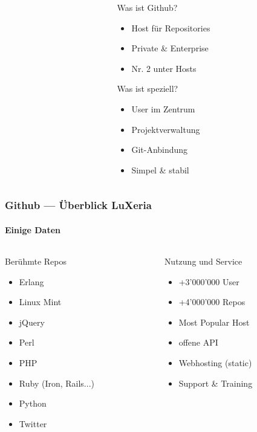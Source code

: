 \begin{frame}
\begin{columns}
\begin{column}{5cm}
		\end{column}
		\begin{column}{5cm}
			\begin{block}{Was ist Github?}
				\begin{itemize}
					\item Host für Repositories
					\item Private \& Enterprise
					\item Nr. 2 unter Hosts
				\end{itemize}
			\end{block}
			\begin{block}{Was ist speziell?}
				\begin{itemize}
					\item User im Zentrum
					\item Projektverwaltung
					\item Git-Anbindung
					\item Simpel \& stabil
				\end{itemize}
			\end{block}
		\end{column}
	\end{columns}
\end{frame}

\begin{frame}
	\frametitle{Github --- Überblick \hfill{} LuXeria}
	\framesubtitle{Einige Daten}
	\begin{columns}
		\begin{column}{5cm}
			\begin{block}{Berühmte Repos}
				\begin{itemize}
					\item Erlang
					\item Linux Mint
					\item jQuery
					\item Perl
					\item PHP
					\item Ruby (Iron, Rails...)
					\item Python
					\item Twitter
				\end{itemize}
			\end{block}
		\end{column}
		\begin{column}{5cm}
			\begin{block}{Nutzung und Service}
				\begin{itemize}
					\item +3'000'000 User
					\item +4'000'000 Repos
					\item Most Popular Host
					\item offene API
					\item Webhosting (static)
					\item Support \& Training
				\end{itemize}
			\end{block}
		\end{column}
	\end{columns}
\end{frame}

